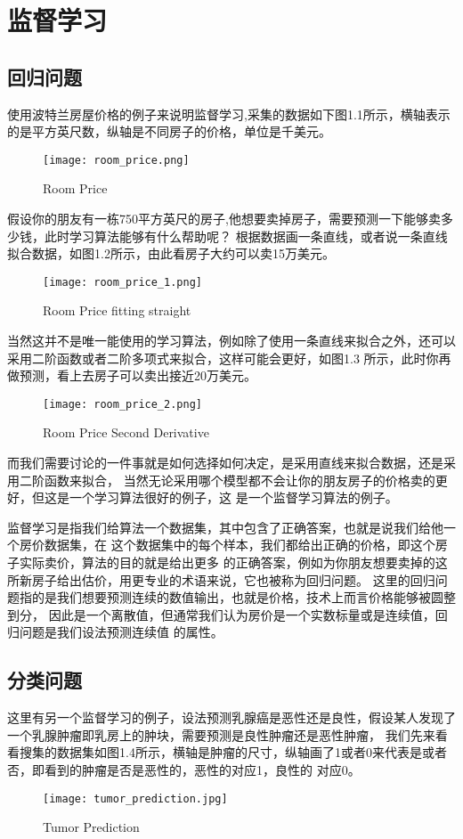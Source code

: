 \section{监督学习}

\subsection{回归问题}
使用波特兰房屋价格的例子来说明监督学习,采集的数据如下图1.1所示，横轴表示的是平方英尺数，纵轴是不同房子的价格，单位是千美元。

\begin{figure}[!hbtp]
\centering
\texttt{[image: room\_price.png]}
\caption{Room Price\label{figur:root_price}}
\end{figure}

假设你的朋友有一栋750平方英尺的房子,他想要卖掉房子，需要预测一下能够卖多少钱，此时学习算法能够有什么帮助呢？
根据数据画一条直线，或者说一条直线拟合数据，如图1.2所示，由此看房子大约可以卖15万美元。
\begin{figure}[H]
\centering
\texttt{[image: room\_price\_1.png]}
\caption{Room Price fitting straight\label{figur:root_price_1}}
\end{figure}

当然这并不是唯一能使用的学习算法，例如除了使用一条直线来拟合之外，还可以采用二阶函数或者二阶多项式来拟合，这样可能会更好，如图1.3
所示，此时你再做预测，看上去房子可以卖出接近20万美元。
\begin{figure}[!hbtp]
\centering
\texttt{[image: room\_price\_2.png]}
\caption{Room Price Second Derivative\label{figur:root_price_2}}
\end{figure}

而我们需要讨论的一件事就是如何选择如何决定，是采用直线来拟合数据，还是采用二阶函数来拟合，
当然无论采用哪个模型都不会让你的朋友房子的价格卖的更好，但这是一个学习算法很好的例子，这
是一个监督学习算法的例子。

监督学习是指我们给算法一个数据集，其中包含了正确答案，也就是说我们给他一个房价数据集，在
这个数据集中的每个样本，我们都给出正确的价格，即这个房子实际卖价，算法的目的就是给出更多
的正确答案，例如为你朋友想要卖掉的这所新房子给出估价，用更专业的术语来说，它也被称为回归问题。
这里的回归问题指的是我们想要预测连续的数值输出，也就是价格，技术上而言价格能够被圆整到分，
因此是一个离散值，但通常我们认为房价是一个实数标量或是连续值，回归问题是我们设法预测连续值
的属性。

\subsection{分类问题}
这里有另一个监督学习的例子，设法预测乳腺癌是恶性还是良性，假设某人发现了一个乳腺肿瘤即乳房上的肿块，需要预测是良性肿瘤还是恶性肿瘤，
我们先来看看搜集的数据集如图1.4所示，横轴是肿瘤的尺寸，纵轴画了1或者0来代表是或者否，即看到的肿瘤是否是恶性的，恶性的对应1，良性的
对应0。
\begin{figure}[H]
\centering
\texttt{[image: tumor\_prediction.jpg]}
\caption{Tumor Prediction\label{figur:tumor_prediction}}
\end{figure}

